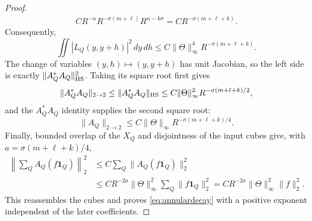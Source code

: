 \documentclass[11pt]{article}
\numberwithin{equation}{section}
\theoremstyle{remark}
\theoremstyle{definition}
\newcommand{\norm}[1]{\lVert #1\rVert}
\begin{document}
\begin{proof}
\[\begin{split}
 C R^{-n}R^{-\sigma(m+\ell)}R^{n-k\sigma}
 =C R^{-\sigma(m+\ell+k)}.
\end{split}
\]
Consequently,
\begin{equation}\label{eq:annular-HS-square}
 \iint|L_Q(y,y+h)|^2\,dy\,dh
 \le C\norm\Theta_\infty^4R^{-\sigma(m+\ell+k)}.
\end{equation}
The change of variables $(y,h)\mapsto(y,y+h)$ has unit Jacobian, so the
left side is exactly
$\norm{A_Q^*A_Q}_{\rm HS}^2$.  Taking its square root first gives
\[
 \norm{A_Q^*A_Q}_{2\to2}
 \le \norm{A_Q^*A_Q}_{\rm HS}
 \le C\norm\Theta_\infty^2R^{-\sigma(m+\ell+k)/2},
\]
and the $A_Q^*A_Q$ identity supplies the second square root:
\[
 \norm{A_Q}_{2\to2}
 \le C\norm\Theta_\infty R^{-\sigma(m+\ell+k)/4}.
\]
Finally, bounded overlap of the $X_Q$ and disjointness of the input cubes
give, with $a=\sigma(m+\ell+k)/4$,
\[
\begin{split}
 \left\|\sum_QA_Q(f\mathbf1_Q)\right\|_2^2
 &\le C\sum_Q\norm{A_Q(f\mathbf1_Q)}_2^2\\
 &\le C R^{-2a}\norm\Theta_\infty^2
       \sum_Q\norm{f\mathbf1_Q}_2^2
 =C R^{-2a}\norm\Theta_\infty^2\norm f_2^2.
\end{split}
\]
This reassembles the cubes and proves
\eqref{eq:annulardecay} with a positive exponent independent of the later
coefficients.


\end{proof}
\end{document}
